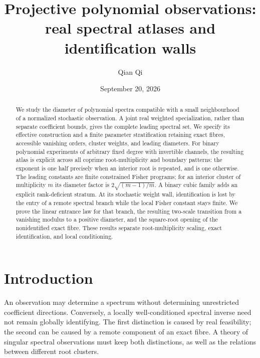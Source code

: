 
\title[Real spectral atlases and identification walls]{Projective polynomial observations:\\ real spectral atlases and identification walls}
\author{Qian Qi}
\date{September 20, 2026}

\begin{abstract}
We study the diameter of polynomial spectra compatible with a small
neighbourhood of a normalized stochastic observation. A joint real weighted
specialization, rather than separate coefficient bounds, gives the complete
leading spectral set. We specify its effective construction and a finite
parameter stratification retaining exact fibres, accessible vanishing orders,
cluster weights, and leading diameters. For binary polynomial experiments of
arbitrary fixed degree with invertible channels, the resulting atlas is
explicit across all coprime root-multiplicity and boundary patterns: the
exponent is one half precisely when an interior root is repeated, and is one
otherwise. The leading constants are finite constrained Fisher programs;
for an interior cluster of multiplicity $m$ its diameter factor is
$2\sqrt{(m-1)/m}$. A binary cubic family adds an explicit rank-deficient
stratum. At its stochastic weight wall, identification is lost by the entry
of a remote spectral branch while the local Fisher constant stays finite.
We prove the linear entrance law for that branch, the resulting two-scale
transition from a vanishing modulus to a positive diameter, and the
square-root opening of the nonidentified exact fibre. These results separate
root-multiplicity scaling, exact identification, and local conditioning.
\end{abstract}
\maketitle

\section{Introduction}
An observation may determine a spectrum without determining unrestricted
coefficient directions. Conversely, a locally well-conditioned spectral
inverse need not remain globally identifying. The first distinction is
caused by real feasibility; the second can be caused by a remote component
of an exact fibre. A theory of singular spectral observations must keep
both distinctions, as well as the relations between different root clusters.

